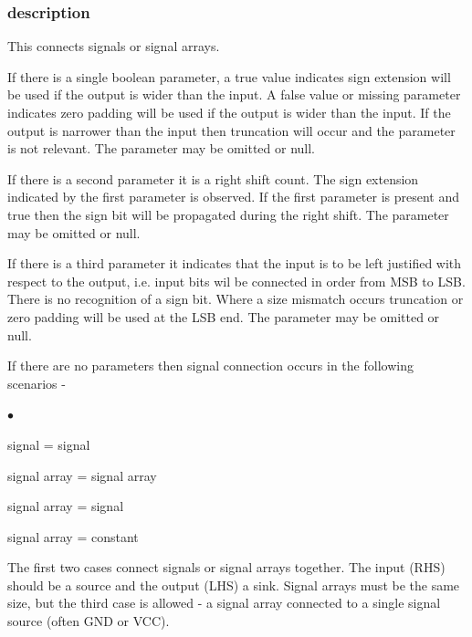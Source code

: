 \documentclass[10pt,a4paper,twoside,fleqn]{book}
\newcommand{\blist}{\begin{list}{$\bullet$}{\setlength{\itemsep}{-5pt}\setlength{\topsep}{-5pt}}}
\newcommand{\blend}{\end{list}}
\begin{document}
            \subsubsection{description}
            
                This connects signals or signal arrays.
                
                If there is a single
                boolean parameter, a true value indicates sign extension will be
                used if the output is wider than the input. A false value or
                missing parameter indicates zero padding will be used if the
                output is wider than the input. If the output is narrower than
                the input then truncation will occur and the parameter is not
                relevant. The parameter may be omitted or null.
                
                If there is a second parameter it is a right shift count. The 
                sign extension indicated by the first parameter is observed.
                If the first parameter is present and true then the sign bit will
                be propagated during the right shift.
                The parameter may be omitted or null.
                
                If there is a third parameter it indicates that the input
                is to be left justified with respect to the output, i.e.
                input bits wil be connected in order from MSB to LSB. There
                is no recognition of a sign bit. Where
                a size mismatch occurs truncation or zero padding will be used
                at the LSB end. The parameter may be omitted or null.

                If there are no parameters then signal connection occurs in the
                following scenarios -
                \blist
                \item   signal = signal
                \item   signal array = signal array
                \item   signal array = signal
                \item   signal array = constant
                \blend
                The first two cases connect signals or signal arrays together.
                The input (RHS) should be a source and the output (LHS) a sink.
                Signal arrays must be the same size, but the third case is
                allowed - a signal array connected to a single signal source
                (often GND or VCC).
\end{document}
